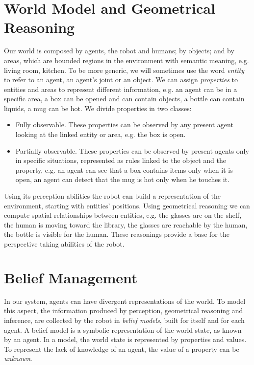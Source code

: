 \section{World Model and Geometrical Reasoning}
\label{sec:situation_assessment-situation_assessment}
Our world is composed by agents, the robot and humans; by objects; and by areas, which are bounded regions in the environment with semantic meaning, e.g. living room, kitchen. To be more generic, we will sometimes use the word \textit{entity} to refer to an agent, an agent's joint or an object. We can assign \textit{properties} to entities and areas to represent different information, e.g. 
an agent can be in a specific area, a box can be opened and can contain objects, a bottle can contain liquids, a mug can be hot. 
 We divide properties in two classes: 
\begin{itemize}
\item Fully observable. These properties can be observed by any present agent looking at the linked entity or area, e.g. the box is open.
\item Partially observable. These properties can be observed by present agents only in specific situations, represented as rules linked to the object and the property, e.g. an agent can see that a box contains items only when it is open, an agent can detect that the mug is hot only when he touches it.
\end{itemize}

Using its perception abilities the robot can build a representation of the environment, starting with entities' positions. Using geometrical reasoning we can compute spatial relationships between entities, e.g. the glasses are on the shelf, the human is moving toward the library, the glasses are reachable by the human, the bottle is visible for the human. These reasonings provide a base for the perspective taking abilities of the robot. 



\section{Belief Management}
\label{sec:situation_assessment-belief_management}
In our system, agents can have divergent representations of the world. To model this aspect, the information produced by perception, geometrical reasoning and inference, are collected by the robot in \textit{belief models}, built for itself and for each agent. A belief model is a symbolic representation of the world state, as known by an agent. In a model, the world state is represented by properties and values. To represent the lack of knowledge of an agent, the value of a property can be \textit{unknown}.

